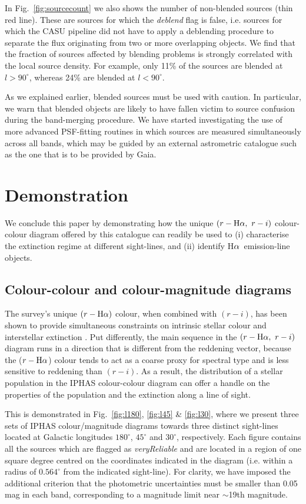 \documentclass[useAMS,usenatbib]{mn2e}
\def\ha{\mbox{H$\rm \alpha$}}
\begin{document}
In Fig.~\ref{fig:sourcecount} we also shows the number
of non-blended sources (thin red line).
These are sources for which the \emph{deblend} flag is {\sc false},
i.e. sources for which the CASU pipeline did not have to apply 
a deblending procedure to separate the flux
originating from two or more overlapping objects.
We find that the fraction of sources affected by blending problems
is strongly correlated with the local source density.
For example, only 11\% of the sources are blended
at $l>90^\circ$, whereas 24\% are blended at $l<90^\circ$.

As we explained earlier, blended sources must be used with caution.
In particular, we warn that blended objects
are likely to have fallen victim
to source confusion during the band-merging procedure.
We have started investigating the use of
more advanced PSF-fitting routines
in which sources are measured simultaneously across all bands,
which may be guided by an external astrometric catalogue
such as the one that is to be provided by Gaia.

\section{Demonstration}
\label{sec:demonstration}

We conclude this paper by demonstrating how the unique
$(r-\ha,\ r-i)$ colour-colour diagram offered by this catalogue
can readily be used to
(i) characterise the extinction regime at different sight-lines, and
(ii) identify \ha\ emission-line objects.

\subsection{Colour-colour and colour-magnitude diagrams}

The survey's unique $(r-\ha)$ colour,
when combined with $(r-i)$,
has been shown to provide simultaneous constraints 
on intrinsic stellar colour and interstellar extinction \citep{Drew2008}. 
Put differently, the main sequence in the $(r-\ha,\ r-i)$ diagram
runs in a direction that is different from the reddening vector,
because the ($r-\ha$) colour tends to act
as a coarse proxy for spectral type
and is less sensitive to reddening than $(r-i)$.
As a result, the distribution of a stellar population
in the IPHAS colour-colour diagram
can offer a handle on the properties of the population
and the extinction along a line of sight.

This is demonstrated 
in Fig.~\ref{fig:l180}, \ref{fig:l45} \& \ref{fig:l30},
where we present three sets of IPHAS colour/magnitude diagrams
towards three distinct sight-lines
located at Galactic longitudes 
$180^\circ$, $45^\circ$ and $30^\circ$, respectively.
Each figure contains all the sources
which are flagged as \emph{veryReliable}
and are located in a region of one square degree 
centred on the coordinates indicated in the diagram
(i.e. within a radius of $0.564^\circ$ from the indicated sight-line).
For clarity, we have imposed the additional criterion
that the photometric uncertainties
must be smaller than 0.05 mag in each band,
corresponding to a magnitude limit near $\sim$19th magnitude.
\end{document}
